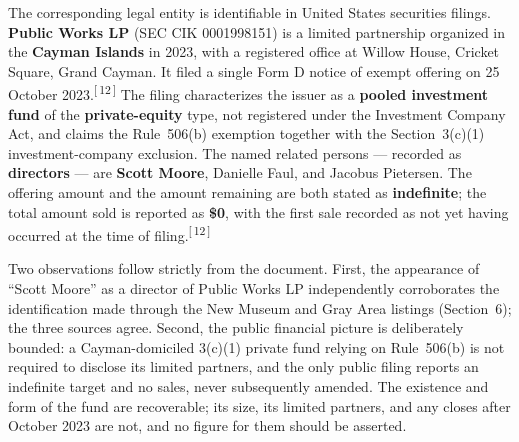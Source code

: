 \documentclass[11pt,letterpaper]{article}
\newcommand{\refn}[1]{\textsuperscript{[\,#1\,]}}
\begin{document}
The corresponding legal entity is identifiable in United States securities
filings. \textbf{Public Works LP} (SEC CIK 0001998151) is a limited
partnership organized in the \textbf{Cayman Islands} in 2023, with a
registered office at Willow House, Cricket Square, Grand Cayman. It filed a
single Form D notice of exempt offering on 25 October 2023.\refn{12} The
filing characterizes the issuer as a \textbf{pooled investment fund} of the
\textbf{private-equity} type, not registered under the Investment Company Act,
and claims the Rule~506(b) exemption together with the Section~3(c)(1)
investment-company exclusion. The named related persons --- recorded as
\textbf{directors} --- are \textbf{Scott Moore}, Danielle Faul, and Jacobus
Pietersen. The offering amount and the amount remaining are both stated as
\textbf{indefinite}; the total amount sold is reported as \textbf{\$0}, with
the first sale recorded as not yet having occurred at the time of
filing.\refn{12}

Two observations follow strictly from the document. First, the appearance of
``Scott Moore'' as a director of Public Works LP independently corroborates
the identification made through the New Museum and Gray Area listings
(Section~6); the three sources agree. Second, the public financial picture is
deliberately bounded: a Cayman-domiciled 3(c)(1) private fund relying on
Rule~506(b) is not required to disclose its limited partners, and the only
public filing reports an indefinite target and no sales, never subsequently
amended. The existence and form of the fund are recoverable; its size, its
limited partners, and any closes after October 2023 are not, and no figure
for them should be asserted.
\end{document}
